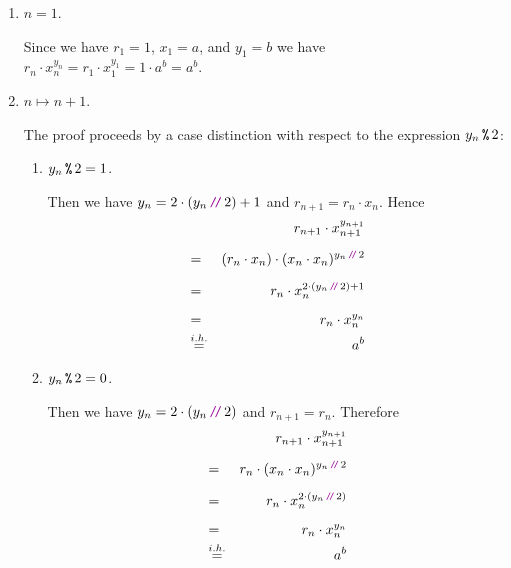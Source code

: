 \begin{enumerate}
\item[B.C.:] $n=1$.

            Since we have $r_1 = 1$, $x_1 = a$, and $y_1 = b$ we have 
            \\[0.2cm]
            \hspace*{1.3cm}
            $r_n \cdot x_n^{y_n} = r_1 \cdot x_1^{y_1} = 1 \cdot a^{b} = a^b$.
\item[I.S.:] $n \mapsto n + 1$.

            The proof proceeds by a case distinction with respect to the expression $y_n \,\texttt{\%}\, 2$:
            \begin{enumerate}
            \item $y_n \,\texttt{\%}\, 2 = 1$.

                  Then we have $y_{n} = 2 \cdot (y_n\dv 2) + 1$ and
                  $r_{n+1} = r_n \cdot x_n$.  Hence
                  \begin{eqnarray*}
                      &   & r_{n+1} \cdot x_{n+1}^{y_{n+1}} \\[0.2cm] 
                      & = & (r_{n} \cdot x_n) \cdot (x_{n} \cdot x_{n})^{y_{n}\dvv 2} \\[0.2cm] 
                      & = & r_{n} \cdot x_n^{2 \cdot (y_{n}\dvv 2) + 1} \\[0.2cm] 
                      & = & r_{n} \cdot x_n^{y_n} \\
                      & \stackrel{i.h.}{=} & a^{b} 
                  \end{eqnarray*}

            \item $y_n \,\texttt{\%}\, 2 = 0$.

                  Then we have $y_{n} = 2 \cdot (y_n\dv 2)$ and $r_{n+1} = r_n$.
                  Therefore
                  \begin{eqnarray*}
                      &   & r_{n+1} \cdot x_{n+1}^{y_{n+1}} \\[0.2cm] 
                      & = & r_{n} \cdot (x_{n} \cdot x_{n})^{y_{n}\dvv 2} \\[0.2cm] 
                      & = & r_{n} \cdot x_n^{2 \cdot (y_{n} \dvv 2)} \\[0.2cm] 
                      & = & r_{n} \cdot x_n^{y_n} \\
                      & \stackrel{i.h.}{=} & a^{b} 
                  \end{eqnarray*}
            \end{enumerate}
\end{enumerate}

